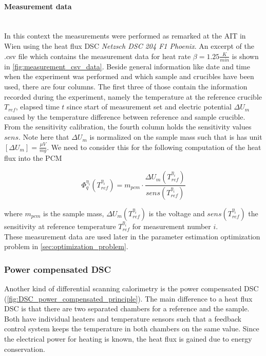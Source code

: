 \documentclass{scrartcl}[12pt, halfparskip]
\numberwithin{equation}{section}
\numberwithin{figure}{section}
\numberwithin{table}{section}
\begin{document}
\paragraph{Measurement data}\mbox{}\\
In this context the measurements were performed as remarked at the AIT in Wien using the heat flux DSC \textit{Netzsch DSC 204 F1 Phoenix\textsuperscript{\textregistered}}. An excerpt of the .csv file which contains the measurement data for heat rate ${\beta=1.25 \frac{K}{min}}$ is shown in \cref{fig:measurement_csv_data}. Beside general information like date and time when the experiment was performed and which sample and crucibles have been used, there are four columns. The first three of those contain the information recorded during the experiment, namely the temperature at the reference crucible $T_{ref}$, elapsed time $t$ since start of measurement set and electric potential $\Delta U_m$ caused by the temperature difference between reference and sample crucible. 
From the sensitivity calibration, the fourth column holds the sensitivity values $sens$.
Note here that $\Delta U_m$ is normalized on the sample mass such that is has unit $[\Delta U_m]=\frac{\mu V}{mg}$. We need to consider this for the following computation of the heat flux into the PCM

\begin{equation}
	\varPhi_q^{\eta_i}(T_{ref}^{\eta_i}) = m_{pcm} \cdot \frac{\Delta U_m(T_{ref}^{\eta_i})}{sens(T_{ref}^{\eta_i})}
\end{equation}

where $m_{pcm}$ is the sample mass, $\Delta U_m(T_{ref}^{\eta_i})$ is the voltage and $sens(T_{ref}^{\eta_i})$ the sensitivity at reference temperature $T_{ref}^{\eta_i}$ for measurement number $i$. \\
These measurement data are used later in the parameter estimation optimization problem in \cref{sec:optimization_problem}.





\subsubsection{Power compensated DSC}
\label{sec:power_compensated_dsc}
Another kind of differential scanning calorimetry is the
power compensated DSC (\cref{fig:DSC_power_compensated_principle}). 
The main difference to a heat flux DSC is that there are two separated chambers for a reference and the sample. Both have individual heaters and temperature sensors such that a feedback control system keeps the temperature in both chambers on the same value. Since the electrical power for heating is known, the heat flux is gained due to energy conservation. \\
\end{document}
